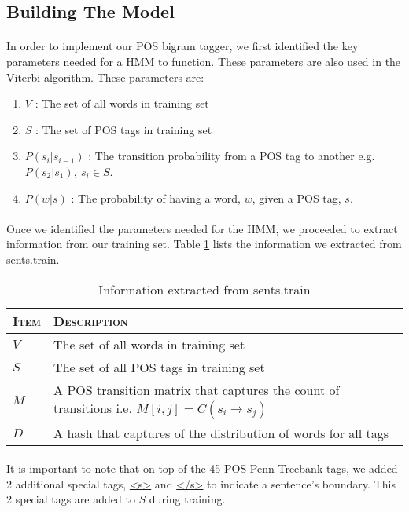 \documentclass[12pt]{article}
\begin{document}
\subsection{Building The Model}
\paragraph{}
In order to implement our POS bigram tagger, we first identified the key parameters needed for a HMM to function. These parameters are also used in the Viterbi algorithm. These parameters are:
\begin{enumerate}
\item $V$ : The set of all words in training set
\item $S$ : The set of POS tags in training set
\item $P(s_i|s_{i-1})$ : The transition probability from a POS tag to another e.g. $P(s_2 | s_{1}),~s_i \in S$.
\item $P(w|s)$ : The probability of having a word, $w$, given a POS tag, $s$.
\end{enumerate}

\paragraph{}
Once we identified the parameters needed for the HMM, we proceeded to extract information from our training set. Table \ref{tab:info} lists the information we extracted from \url{sents.train}.

\begin{table}[h]
	\center
	\begin{tabular}{ l p{10cm}}
		\textsc{Item} & \textsc{Description}\\
		\hline
		$V$ & The set of all words in training set \\
		$S$ & The set of all POS tags in training set \\
		$M$ & A POS transition matrix that captures the count of transitions i.e. $M[i,j] = C(s_i \rightarrow s_j)$\\
		$D$ & A hash that captures of the distribution of words for all tags\\
	\end{tabular}
	\caption{Information extracted from sents.train}
	\label{tab:info}
\end{table}

\paragraph{}
It is important to note that on top of the 45 POS Penn Treebank tags, we added 2 additional special tags, \url{<s>} and \url{</s>} to indicate a sentence's boundary. This 2 special tags are added to $S$ during training.
\end{document}
